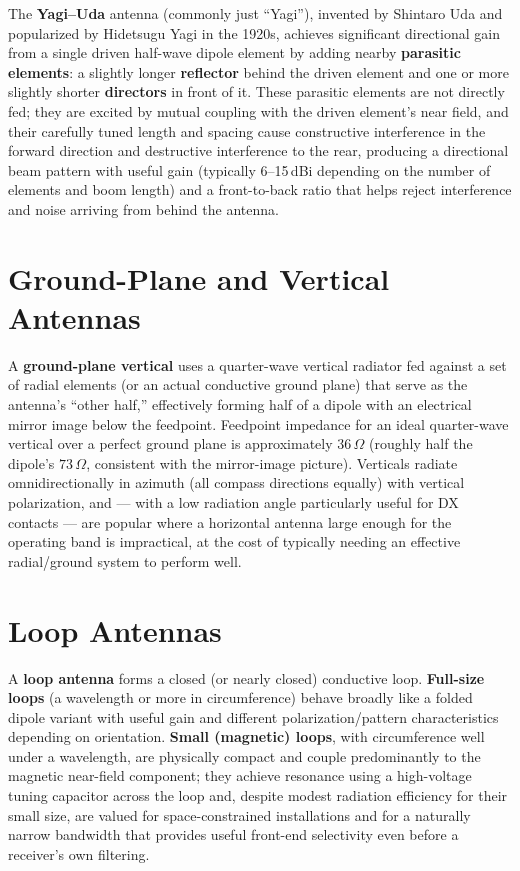 The \textbf{Yagi--Uda} antenna (commonly just ``Yagi''), invented by
Shintaro Uda and popularized by Hidetsugu Yagi in the 1920s, achieves
significant directional gain from a single driven half-wave dipole
element by adding nearby \textbf{parasitic elements}: a slightly longer
\textbf{reflector} behind the driven element and one or more slightly
shorter \textbf{directors} in front of it. These parasitic elements are
not directly fed; they are excited by mutual coupling with the driven
element's near field, and their carefully tuned length and spacing
cause constructive interference in the forward direction and
destructive interference to the rear, producing a directional beam
pattern with useful gain (typically 6--15\,dBi depending on the number
of elements and boom length) and a front-to-back ratio that helps reject
interference and noise arriving from behind the antenna.

\section{Ground-Plane and Vertical Antennas}


A \textbf{ground-plane vertical} uses a quarter-wave vertical radiator
fed against a set of radial elements (or an actual conductive ground
plane) that serve as the antenna's ``other half,'' effectively forming
half of a dipole with an electrical mirror image below the
feedpoint. Feedpoint impedance for an ideal quarter-wave vertical over a
perfect ground plane is approximately $36\,\Omega$ (roughly half the
dipole's $73\,\Omega$, consistent with the mirror-image picture).
Verticals radiate omnidirectionally in azimuth (all compass directions
equally) with vertical polarization, and --- with a low radiation angle
particularly useful for DX contacts --- are popular where a horizontal
antenna large enough for the operating band is impractical, at the cost
of typically needing an effective radial/ground system to perform well.

\section{Loop Antennas}


A \textbf{loop antenna} forms a closed (or nearly closed) conductive
loop. \textbf{Full-size loops} (a wavelength or more in circumference)
behave broadly like a folded dipole variant with useful gain and
different polarization/pattern characteristics depending on
orientation. \textbf{Small (magnetic) loops}, with circumference well
under a wavelength, are physically compact and couple predominantly to
the magnetic near-field component; they achieve resonance using a
high-voltage tuning capacitor across the loop and, despite modest
radiation efficiency for their small size, are valued for
space-constrained installations and for a naturally narrow bandwidth
that provides useful front-end selectivity even before a receiver's own
filtering.

